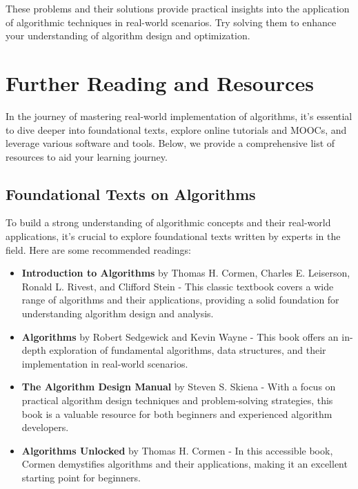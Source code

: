 \documentclass[12pt]{book} %
\begin{document}
These problems and their solutions provide practical insights into the application of algorithmic techniques in real-world scenarios. Try solving them to enhance your understanding of algorithm design and optimization.

\section{Further Reading and Resources}

In the journey of mastering real-world implementation of algorithms, it's essential to dive deeper into foundational texts, explore online tutorials and MOOCs, and leverage various software and tools. Below, we provide a comprehensive list of resources to aid your learning journey.

\subsection{Foundational Texts on Algorithms}

To build a strong understanding of algorithmic concepts and their real-world applications, it's crucial to explore foundational texts written by experts in the field. Here are some recommended readings:

\begin{itemize}
    \item \textbf{Introduction to Algorithms} by Thomas H. Cormen, Charles E. Leiserson, Ronald L. Rivest, and Clifford Stein - This classic textbook covers a wide range of algorithms and their applications, providing a solid foundation for understanding algorithm design and analysis.
    
    \item \textbf{Algorithms} by Robert Sedgewick and Kevin Wayne - This book offers an in-depth exploration of fundamental algorithms, data structures, and their implementation in real-world scenarios.
    
    \item \textbf{The Algorithm Design Manual} by Steven S. Skiena - With a focus on practical algorithm design techniques and problem-solving strategies, this book is a valuable resource for both beginners and experienced algorithm developers.
    
    \item \textbf{Algorithms Unlocked} by Thomas H. Cormen - In this accessible book, Cormen demystifies algorithms and their applications, making it an excellent starting point for beginners.
\end{itemize}
\end{document}
